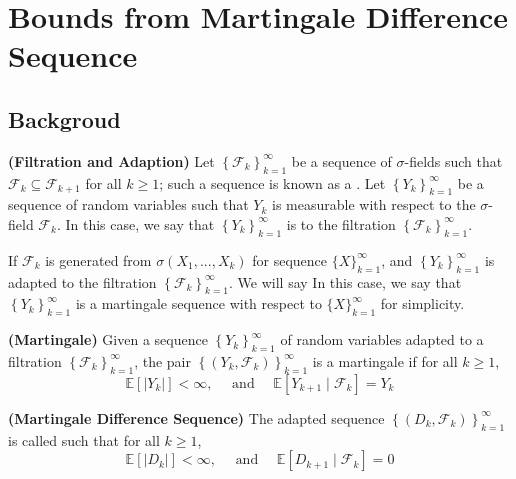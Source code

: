 \documentclass{article}
\newcommand{\bfs}[1]{\textbf{({#1})}}
\begin{document}
\section{Bounds from Martingale Difference Sequence}\label{secmar}
\subsection{Backgroud}
\begin{defa}{\bfs{Filtration and Adaption}}
Let $\left\{\mathcal{F}_{k}\right\}_{k=1}^{\infty}$ be a sequence of $\sigma$-fields such that $\mathcal{F}_{k} \subseteq \mathcal{F}_{k+1}$ for all $k \geq 1$; such a sequence is known as a . Let $\left\{Y_{k}\right\}_{k=1}^{\infty}$ be a sequence of random variables such that $Y_{k}$ is measurable with respect to the $\sigma$-field $\mathcal{F}_{k}$. In this case, we say that $\left\{Y_{k}\right\}_{k=1}^{\infty}$ is  to the filtration $\left\{\mathcal{F}_{k}\right\}_{k=1}^{\infty} .$
\end{defa}
\begin{rema}
If $\mathcal{F}_{k}$ is generated from $\sigma(X_1,...,X_k)$ for sequence $\{X\}_{k=1}^{\infty}$, and $\left\{Y_{k}\right\}_{k=1}^{\infty}$ is adapted to the filtration $\left\{\mathcal{F}_{k}\right\}_{k=1}^{\infty}$. We will say In this case, we say that $\left\{Y_{k}\right\}_{k=1}^{\infty}$ is a martingale sequence with respect to $\{X\}_{k=1}^{\infty}$ for simplicity.
\end{rema}
\begin{defa}{\bfs{Martingale}}
Given a sequence $\left\{Y_{k}\right\}_{k=1}^{\infty}$ of random variables adapted to a filtration $\left\{\mathcal{F}_{k}\right\}_{k=1}^{\infty}$, the pair $\left\{\left(Y_{k}, \mathcal{F}_{k}\right)\right\}_{k=1}^{\infty}$ is a martingale if for all $k \geq 1$,
$$
\mathbb{E}\left[\left|Y_{k}\right|\right]<\infty, \quad \text { and } \quad \mathbb{E}\left[Y_{k+1} \mid \mathcal{F}_{k}\right]=Y_{k}
$$
\end{defa}
\begin{defa}{\bfs{Martingale Difference Sequence}}
The adapted sequence $\left\{\left(D_{k}, \mathcal{F}_{k}\right)\right\}_{k=1}^{\infty}$ is called  such that for all $k \geq 1$,
$$
\mathbb{E}\left[\left|D_{k}\right|\right]<\infty, \quad \text { and } \quad \mathbb{E}\left[D_{k+1} \mid \mathcal{F}_{k}\right]=0
$$
\end{defa}
\end{document}
